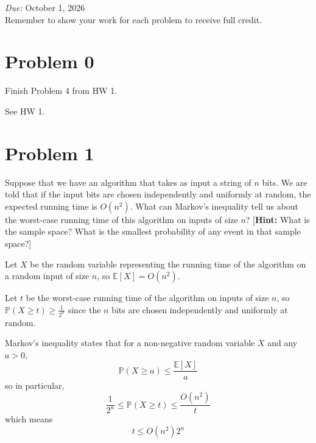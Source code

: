 \documentclass[12pt,letterpaper]{article}
\renewcommand{\P}{\mathbb{P}}
\newcommand{\DUEDATE}{October 1, 2026}
\begin{document}
\begin{center}
    \vspace{10pt}
    \textit{Due:} \DUEDATE\\
    Remember to show your work for each problem to receive full credit.
\end{center}
\section*{Problem 0}
Finish Problem 4 from HW 1.

\color{darkblue}
    See HW 1. 
\color{black}


\section*{Problem 1}

Suppose that we have an algorithm that takes as input a string of $n$ bits. We are told that if the input bits are chosen independently and uniformly at random, the expected running time is $O(n^2)$. What can Markov's inequality tell us about the worst-case running time of this algorithm on inputs of size $n$? [\textbf{Hint:} What is the sample space? What is the smallest probability of any event in that sample space?]

\color{darkblue}
    Let $X$ be the random variable representing the running time of the algorithm on a random input of size $n$, so $\mathbb{E}[X] = O(n^2)$.

    Let $t$ be the worst-case running time of the algorithm on inputs of size $n$, so $\P(X \geq t) \geq \frac{1}{2^n}$ since the $n$ bits are chosen independently and uniformly at random.

    Markov's inequality states that for a non-negative random variable $X$ and any $a > 0$, 
    \[\P(X \geq a) \leq \frac{\mathbb{E}[X]}{a}\]
    so in particular, 
    \[\frac{1}{2^n} \leq \P(X \geq t) \leq \frac{O(n^2)}{t}\]
    which means 
    \[t \leq O(n^2) 2^n\]

\color{black}
\end{document}
